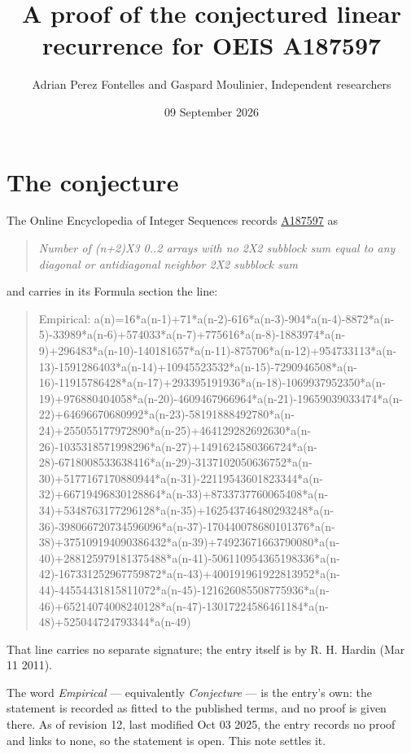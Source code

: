 \documentclass[11pt]{article}
\title{A proof of the conjectured linear recurrence for OEIS A187597}
\author{Adrian Perez Fontelles and Gaspard Moulinier, Independent researchers}
\date{09 September 2026}
\theoremstyle{definition}
\begin{document}
\maketitle
\section{The conjecture}

The Online Encyclopedia of Integer Sequences records \href{https://oeis.org/A187597}{A187597} as

\begin{quote}\itshape Number of (n+2)X3 0..2 arrays with no 2X2 subblock sum equal to any diagonal or antidiagonal neighbor 2X2 subblock sum\end{quote}

and carries in its Formula section the line:

\begin{quote}\ttfamily Empirical: a(n)=16*a(n-1)+71*a(n-2)-616*a(n-3)-904*a(n-4)-8872*a(n-5)-33989*a(n-6)+574033*a(n-7)+775616*a(n-8)-1883974*a(n-9)+296483*a(n-10)-140181657*a(n-11)-875706*a(n-12)+954733113*a(n-13)-1591286403*a(n-14)+10945523532*a(n-15)-7290946508*a(n-16)-11915786428*a(n-17)+293395191936*a(n-18)-1069937952350*a(n-19)+976880404058*a(n-20)-4609467966964*a(n-21)-19659039033474*a(n-22)+64696670680992*a(n-23)-58191888492780*a(n-24)+255055177972890*a(n-25)+464129282692630*a(n-26)-1035318571998296*a(n-27)+1491624580366724*a(n-28)-6718008533638416*a(n-29)-3137102050636752*a(n-30)+5177167170880944*a(n-31)-22119543601823344*a(n-32)+66719496830128864*a(n-33)+8733737760065408*a(n-34)+5348763177296128*a(n-35)+162543746480293248*a(n-36)-398066720734596096*a(n-37)-170440078680101376*a(n-38)+375109194090386432*a(n-39)+74923671663790080*a(n-40)+288125979181375488*a(n-41)-506110954365198336*a(n-42)-167331252967759872*a(n-43)+400191961922813952*a(n-44)-44554431815811072*a(n-45)-121626085508775936*a(n-46)+65214074008240128*a(n-47)-13017224586461184*a(n-48)+525044724793344*a(n-49)\end{quote}

That line carries no separate signature; the entry itself is by R. H. Hardin (Mar 11 2011).

The word {\itshape Empirical} --- equivalently {\itshape Conjecture} --- is the entry's own: the statement is recorded as fitted to the published terms, and no proof is given there. As of revision 12, last modified Oct 03 2025, the entry records no proof and links to none, so the statement is open. This note settles it.
\end{document}
